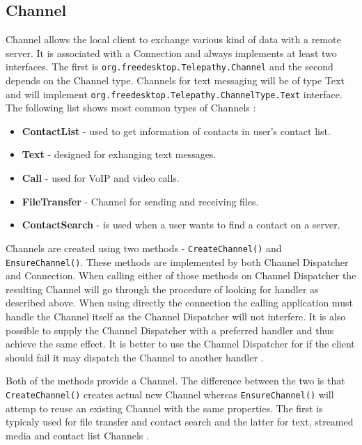 \subsection*{Channel}
Channel allows the local client to exchange various kind of data with a remote server. It is associated with a Connection and always implements at least two interfaces. The first is \verb|org.freedesktop.Telepathy.Channel| and the second depends on the Channel type. Channels for text messaging will be of type Text and will implement \newline \verb|org.freedesktop.Telepathy.ChannelType.Text| interface. The following list shows most common types of Channels \cite{TPWiki}:

\begin{itemize}

	\item {\bf ContactList} - used to get information of contacts in user's contact list.

	\item {\bf Text} - designed for exhanging text messages. 

	\item {\bf Call} - used for VoIP and video calls. 

	\item {\bf FileTransfer} - Channel for sending and receiving files.

	\item {\bf ContactSearch} - is used when a user wants to find a contact on a server.

\end{itemize}

Channels are created using two methods - \verb|CreateChannel()| and \verb|EnsureChannel()|. These methods are implemented by both Channel Dispatcher and Connection. When calling either of those methods on Channel Dispatcher the resulting Channel will go through the procedure of looking for handler as described above. When using directly the connection the calling application must handle the Channel itself as the Channel Dispatcher will not interfere. It is also possible to supply the Channel Dispatcher with a preferred handler and thus achieve the same effect. It is better to use the Channel Dispatcher for if the client should fail it may dispatch the Channel to another handler \cite{TPWiki}.

Both of the methods provide a Channel. The difference between the two is that \verb|CreateChannel()| creates actual new Channel whereas \verb|EnsureChannel()| will attemp to reuse an existing Channel with the same properties. The first is typicaly used for file transfer and contact search and the latter for text, streamed media and contact list Channels \cite{TPWiki}.

